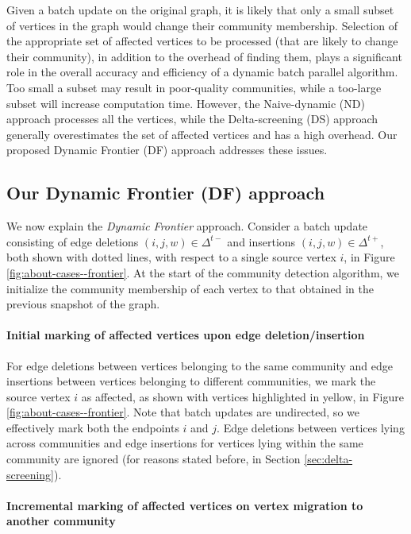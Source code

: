 Given a batch update on the original graph, it is likely that only a small subset of vertices in the graph would change their community membership. Selection of the appropriate set of affected vertices to be processed (that are likely to change their community), in addition to the overhead of finding them, plays a significant role in the overall accuracy and efficiency of a dynamic batch parallel algorithm. Too small a subset may result in poor-quality communities, while a too-large subset will increase computation time. However, the Naive-dynamic (ND) approach processes all the vertices, while the Delta-screening (DS) approach generally overestimates the set of affected vertices and has a high overhead. Our proposed Dynamic Frontier (DF) approach addresses these issues.




\subsection{Our Dynamic Frontier (DF) approach}
\label{sec:frontier}

We now explain the \textit{Dynamic Frontier} approach. Consider a batch update consisting of edge deletions $(i, j, w) \in \Delta^{t-}$ and insertions $(i, j, w) \in \Delta^{t+}$, both shown with dotted lines, with respect to a single source vertex $i$, in Figure \ref{fig:about-cases--frontier}. At the start of the community detection algorithm, we initialize the community membership of each vertex to that obtained in the previous snapshot of the graph.



\paragraph{Initial marking of affected vertices upon edge deletion/insertion}

For edge deletions between vertices belonging to the same community and edge insertions between vertices belonging to different communities, we mark the source vertex $i$ as affected, as shown with vertices highlighted in yellow, in Figure \ref{fig:about-cases--frontier}. Note that batch updates are undirected, so we effectively mark both the endpoints $i$ and $j$. Edge deletions between vertices lying across communities and edge insertions for vertices lying within the same community are ignored (for reasons stated before, in Section \ref{sec:delta-screening}).

\paragraph{Incremental marking of affected vertices on vertex migration to another community}

